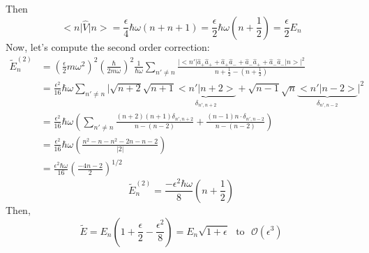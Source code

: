 \documentclass[12pt,fancychapters]{report}
\numberwithin{equation}{section}
\begin{document}
Then
\begin{equation*}
	\big<n\big|\hat{V}\big|n\big> = \frac{\epsilon}{4}\hbar\omega\left(n+n+1\right) = \frac{\epsilon}
{2}\hbar\omega\left(n+\frac{1}{2}\right) = \boxed{\frac{\epsilon}{2}E_n}
\end{equation*}
Now, let's compute the second order correction:
\begin{align*}
	\tilde{E}_n^{(2)} &= \left(\frac{\epsilon}{2}m\omega^2\right)^2 \left(\frac{\hbar}{2m\omega}\right)^2
	\frac{1}{\hbar\omega}\sum_{n'\neq n}\frac{\big|\big<n'\big|\hat{a}_+ \hat{a}_+ + \hat{a}_+
	\hat{a}_- + \hat{a}_- \hat{a}_+ +\hat{a}_-\hat{a}_-\big|n\big>\big|^2}{n+\frac{1}{2} - 
	\left(n+\frac{1}{2}\right)}\\
	&= \frac{\epsilon^2}{16}\hbar\omega\sum_{n'\neq n}\big|\sqrt{n+2}\sqrt{n+1}\underbrace{\big<n'
	\big|n+2\big>}_{\delta_{n',n+2}} + \sqrt{n-1}\sqrt{n}\underbrace{\big<n'\big|n-2\big>}
	_{\delta_{n',n-2}}\big|^2\\
	&= \frac{\epsilon^2}{16}\hbar\omega\left(\sum_{n'\neq n} \frac{(n+2)(n+1)
	\delta_{n',n+2}}{n-(n-2)}+\frac{(n-1)n\cdot\delta_{n',n-2}}{n-(n-2)}\right)\\
	&= \frac{\epsilon^2}{16}\hbar\omega\left(\frac{n^2-n-n^2-2n-n-2}{|2|}\right)\\
	&= \frac{\epsilon^2 \hbar\omega}{16}\left(\frac{-4n-2}{2}\right)^{1/2}
\end{align*}
\begin{equation*}
	\boxed{\tilde{E}_n^{(2)} = \frac{-\epsilon^2\hbar\omega}{8}\left(n+\frac{1}{2}\right)}
\end{equation*}
Then,
\begin{equation*}
	\tilde{E} = E_n\left(1+\frac{\epsilon}{2}-\frac{\epsilon^2}{8}\right)
	= E_n\sqrt{1+\epsilon}\,\,\,\,\text{to}\,\,\,\,\mathcal{O}(\epsilon^3)
\end{equation*}
\end{document}
